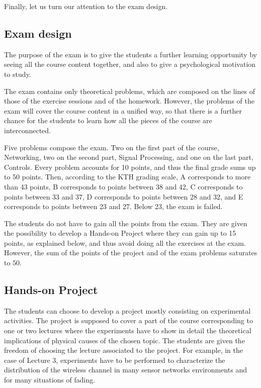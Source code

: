 \documentclass[onecolumn,12pt,draftclsnofoot,a4paper,peerreview]{IEEEtran}
\begin{document}
Finally, let us turn our attention to the exam design. 

\subsection{Exam design} \label{exam design}

The purpose of the exam is to give the students a further learning opportunity by seeing all the course content together, and also to give a psychological motivation to study. 

The exam contains only theoretical problems, which are composed on the lines of those of the exercise sessions and of the homework. However, the problems of the exam will cover the course content in a unified way, so that there is a further chance for the students to learn how all the pieces of the course are interconnected.  

Five problems compose the exam. Two on the first part of the course, Networking, two on the second part, Signal Processing, and one on the last part, Controls. Every problem accounts for 10 points, and thus the final grade sums up to 50 points. Then, according to the KTH grading scale, A corresponds to more than 43 points, B corresponds to points between 38 and 42, C corresponds to points between 33 and 37, D corresponds to points between 28 and 32, and E corresponds to points between 23 and 27. Below 23, the exam is failed.  

The students do not have to gain all the points from the exam. They are given the possibility to develop a Hands-on Project where they can gain up to 15 points, as explained below, and thus avoid doing all the exercises at the exam. However, the sum of the points of the project and of the exam problems saturates to $50$. 

\subsection{Hands-on Project}\label{handsonprojects}

The students can choose to develop a project mostly consisting on experimental activities. The project is supposed to cover a part of the course corresponding to one or two lectures where the experiments have to show in detail the theoretical implications of physical causes of the chosen topic. The students are given the freedom of choosing the lecture associated to the project. For example, in the case of Lecture 3, experiments have to be performed to characterize the distribution of the wireless channel in many sensor networks environments and for many situations of fading. 
\end{document}
